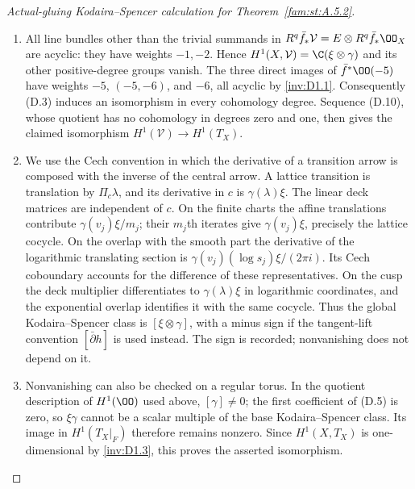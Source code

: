 \begin{proof}[Actual-gluing Kodaira--Spencer calculation for Theorem~\ref{fam:st:A.5.2}]
\begin{enumerate}[label=\arabic*.,leftmargin=*]
\item All line bundles other than the trivial summands in
$R^q\bar f_*\mathcal V=E\otimes R^q\bar f_*\OO_X$ are acyclic:
they have weights $-1,-2$. Hence $H^1(X,\mathcal V)=
\C(\xi\otimes\gamma)$ and its other positive-degree groups vanish.
The three direct images of $\bar f^*\OO(-5)$ have weights
$-5$, $(-5,-6)$, and $-6$, all acyclic by \ref{inv:D1.1}. Consequently (D.3)
induces an isomorphism in every cohomology degree. Sequence (D.10),
whose quotient has no cohomology in degrees zero and one, then gives
the claimed isomorphism $H^1(\mathcal V)\to H^1(T_X)$.

\item We use the Cech convention in which the derivative of a transition
arrow is composed with the inverse of the central arrow. A lattice
transition is translation by $\Pi_c\lambda$, and its derivative in
$c$ is $\gamma(\lambda)\xi$. The linear deck matrices are independent
of $c$. On the finite charts the affine translations contribute
$\gamma(v_j)\xi/m_j$; their $m_j$th iterates give
$\gamma(v_j)\xi$, precisely the lattice cocycle. On the overlap with
the smooth part the derivative of the logarithmic translating section
is $\gamma(v_j)(\log s_j)\xi/(2\pi i)$. Its Cech coboundary accounts
for the difference of these representatives. On the cusp the deck
multiplier differentiates to $\gamma(\lambda)\xi$ in logarithmic
coordinates, and the exponential overlap identifies it with the same
cocycle. Thus the global Kodaira--Spencer class is
$[\xi\otimes\gamma]$, with a minus sign if the tangent-lift convention
$[\bar\partial h]$ is used instead. The sign is recorded; nonvanishing
does not depend on it.

\item Nonvanishing can also be checked on a regular torus. In the quotient
description of $H^1(\OO)$ used above, $[\gamma]\ne0$; the first
coefficient of (D.5) is zero, so $\xi\gamma$ cannot be a scalar
multiple of the base Kodaira--Spencer class. Its image in
$H^1(T_X|_F)$ therefore remains nonzero. Since $H^1(X,T_X)$ is
one-dimensional by \ref{inv:D1.3}, this proves the asserted isomorphism.
\end{enumerate}
\end{proof}

